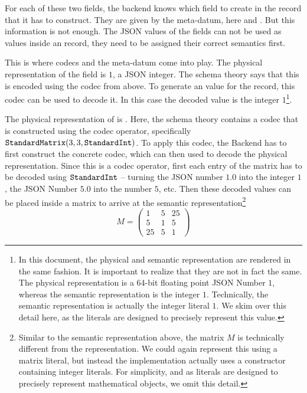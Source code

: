 For each of these two fields, the backend knows which field to create in the \mmt record
that it has to construct.  They are given by the  meta-datum, here
 and .  But this information is not
enough.  The JSON values of the fields can not be used as values inside an \mmt record,
they need to be assigned their correct semantics first.

This is where codecs and the  meta-datum come into play. 
The physical representation of the  field is $1$, a JSON integer. 
The schema theory says that this is encoded using the  codec from above. 
To generate an \mmt value for the record, this codec can be used to decode it. 
In this case the decoded value is the integer $1$\footnote{
  In this document, the physical and semantic representation are rendered in the same fashion. 
  It is important to realize that they are not in fact the same. 
  The physical representation is a 64-bit floating point JSON Number $1$, whereas the semantic representation is the integer $1$. 
  Technically, the semantic representation is actually the \ommt integer literal $1$. 
  We skim over this detail here, as the \ommt literals are designed to precisely represent this value. 
}. 

The physical representation of  is
\inlinecode{[[1.0,5.0,25.0],[5.0,1.0,5.0],[25.0,5.0,1.0]]}.  Here, the schema theory
contains a codec that is constructed using the  codec operator,
specifically \\$\plaintt{StandardMatrix}(3, 3,
\plaintt{StandardInt})$.  To apply this codec, the Backend has to first construct the
concrete codec, which can then used to decode the physical representation.  Since this is
a codec operator, first each entry of the matrix has to be decoded using
$\plaintt{StandardInt}$ -- turning the JSON number $1.0$ into the integer
$1$, the JSON Number $5.0$ into the number
$5$, etc.  Then these decoded values can be placed inside a matrix to arrive at the
semantic representation\footnote{Similar to the semantic representation above, the matrix
  $M$ is technically different from the \ommt representation.  We could again represent
  this using a matrix literal, but instead the implementation actually uses a constructor
  containing integer literals.  For simplicity, and as literals are designed to precisely
  represent mathematical objects, we omit this detail.  } 
\[M = \left( \begin{array}{ccc}
               1 & 5 & 25 \\
               5 & 1 & 5 \\
               25 & 5 & 1 
             \end{array}
           \right)
\]

